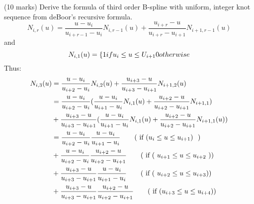 (10 marks) Derive the formula of third order B-spline with uniform, integer knot sequence from deBoor’s recursive formula.
$$N_{i,r}(u) = \frac {u - u_{i}} {u_{i+r-1} - u_{i}} N_{i,r-1}(u)     +      \frac{u_{i+r} - u } { u_{i+r} - u_{i+1}} N_{i+1,r-1} (u)$$
and 
$$N_{i,1}(u) = \{ 1 if u_{i} \leq  u  \leq U_{i+1} \\ 0 otherwise$$
Thus:
\begin{align*}
N_{i,3}(u)  &= \frac {u - u_{i}} {u_{i+2} - u_{i}} N_{i,2}(u)     +      \frac{u_{i+3} - u} { u_{i+3} - u_{i+1}} N_{i+1,2} (u)  \\
            &= \frac {u - u_{i}} {u_{i+2} - u_{i}} ( \frac{u - u_{i}} {u_{i+1} - u_{i}} N_{i,1}(u) +  \frac{u_{i+2} - u } { u_{i+2} - u_{i+1}} N_{i+1,1} )\\
            &+ \frac {u_{i+3} - u} { u_{i+3} - u_{i+1}} ( \frac {u - u_{i}} {u_{i+1} - u_{i}} N_{i,1}(u) +  \frac{u_{i+2} - u } { u_{i+2} - u_{i+1} } N_{i+1,1}(u) ) \\
            &= \frac {u - u_{i}} {u_{i+2} - u_{i}} \frac{u - u_{i}} {u_{i+1} - u_{i}}  \tag{\text{ if ($ u_i \leq u \leq u_{i+1} $) } } \\
            &+ \frac {u - u_{i}} {u_{i+2} - u_{i}}  \frac{u_{i+2} - u } { u_{i+2} - u_{i+1}}  \tag{\text{ if ( $u_{i+1} \leq u \leq u_{i+2}$ )}} \\
            &+ \frac {u_{i+3} - u} { u_{i+3} - u_{i+1}} \frac {u - u_{i}} {u_{i+1} - u_{i}} \tag{\text{ if ( $u_{i+2} \leq u \leq u_{i+3} $)}} \\
            &+ \frac {u_{i+3} - u} { u_{i+3} - u_{i+1}} \frac{u_{i+2} - u } { u_{i+2} - u_{i+1} } \tag{\text{ if ($ u_{i+3} \leq u \leq u_{i+4} $)}}
\end{align*}
